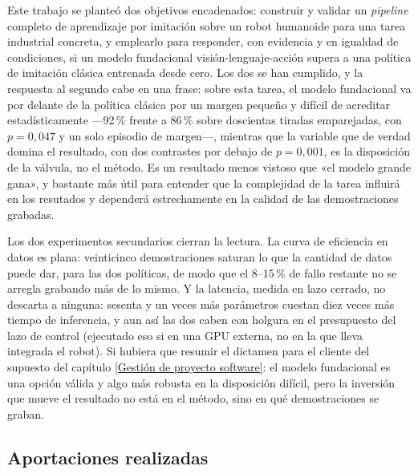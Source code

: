 \label{Conclusión}

Este trabajo se planteó dos objetivos encadenados: construir y validar un \textit{pipeline}
completo de aprendizaje por imitación sobre un robot humanoide para una tarea industrial concreta,
y emplearlo para responder, con evidencia y en igualdad de condiciones, si un modelo fundacional
visión-lenguaje-acción supera a una política de imitación clásica entrenada desde cero. Los dos se
han cumplido, y la respuesta al segundo cabe en una frase: sobre esta tarea, el modelo fundacional
va por delante de la política clásica por un margen pequeño y difícil de acreditar
estadísticamente —92\,\% frente a 86\,\% sobre doscientas tiradas emparejadas, con
$p = 0{,}047$ y un solo episodio de margen—, mientras que la variable que de verdad domina el
resultado, con dos contrastes por debajo de $p = 0{,}001$, es la disposición de la válvula, no el
método. Es un resultado menos vistoso que «el modelo grande gana», y bastante más útil para entender que la complejidad de la tarea influirá en los resutados y dependerá estrechamente en la calidad de las demostraciones grabadas.

Los dos experimentos secundarios cierran la lectura. La curva de eficiencia en datos es plana:
veinticinco demostraciones saturan lo que la cantidad de datos puede dar, para las dos políticas,
de modo que el 8--15\,\% de fallo restante no se arregla grabando más de lo mismo. Y la latencia,
medida en lazo cerrado, no descarta a ninguna: sesenta y un veces más parámetros cuestan diez veces
más tiempo de inferencia, y aun así las dos caben con holgura en el presupuesto del lazo de control (ejecutado eso si en una GPU externa, no en la que lleva integrada el robot).
Si hubiera que resumir el dictamen para el cliente del supuesto del capítulo
\ref{Gestión de proyecto software}: el modelo fundacional es una opción válida y algo más robusta
en la disposición difícil, pero la inversión que mueve el resultado no está en el método, sino en
qué demostraciones se graban.


\subsection*{Aportaciones realizadas}


